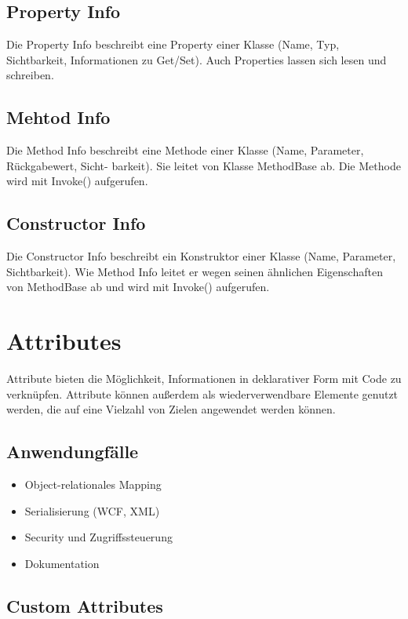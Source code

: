 \subsection{Property Info}
Die Property Info beschreibt eine Property einer Klasse (Name, Typ, Sichtbarkeit, Informationen zu Get/Set). Auch Properties lassen sich lesen und schreiben.

\subsection{Mehtod Info}
Die Method Info beschreibt eine Methode einer Klasse (Name, Parameter, Rückgabewert, Sicht- barkeit). Sie leitet von Klasse MethodBase ab. Die Methode wird mit Invoke() aufgerufen.

\subsection{Constructor Info}
Die Constructor Info beschreibt ein Konstruktor einer Klasse (Name, Parameter, Sichtbarkeit). Wie Method Info leitet er wegen seinen ähnlichen Eigenschaften von MethodBase ab und wird mit Invoke() aufgerufen.


\section{Attributes}
Attribute bieten die Möglichkeit, Informationen in deklarativer Form mit Code zu verknüpfen. Attribute können außerdem als wiederverwendbare Elemente genutzt werden, die auf eine Vielzahl von Zielen angewendet werden können.

\subsection{Anwendungfälle}
\begin{itemize}
  \itemsep -0.5em 
  \item Object-relationales Mapping
  \item Serialisierung (WCF, XML)
  \item Security und Zugriffssteuerung
  \item Dokumentation
\end{itemize}

\subsection{Custom Attributes}

\pagebreak

